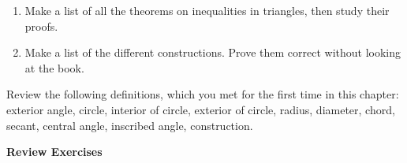 \documentclass[11pt]{book}
\begin{document}
\begin{enumerate}[label=(\alph*), leftmargin=2.2em, itemsep=3pt]
\item Make a list of all the theorems on inequalities in triangles, then study
  their proofs.
\item Make a list of the different \RC{} constructions. Prove them correct
  without looking at the book.
\end{enumerate}

Review the following definitions, which you met for the first time in this
chapter: exterior angle, circle, interior of circle, exterior of circle,
radius, diameter, chord, secant, central angle, inscribed angle, \RC{}
construction.

\begin{center}\bfseries Review Exercises\end{center}\nopagebreak
\end{document}
